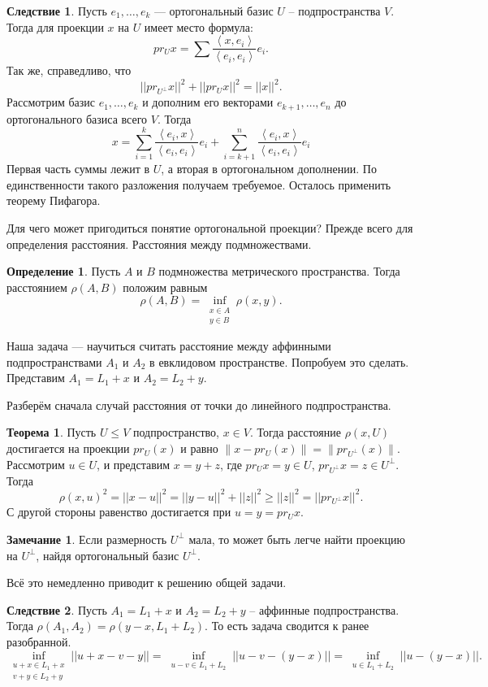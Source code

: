 \documentclass[10pt,a4paper,oneside]{book} %
\theoremstyle{definition}
\newtheorem*{rem}{Замечание}
\newtheorem*{defn}{Определение}
\newtheorem{thm}{Теорема}
\newtheorem{cor}{Следствие}
\def\lan{\left\langle }
\def\ran{\right\rangle}
\def\thrm{\begin{thm}}
\def\ethrm{\end{thm}}
\def\dfn{\begin{defn}}
\def\edfn{\end{defn}}
\def\crl{\begin{cor}}
\def\ecrl{\end{cor}}
\def\rm{\begin{rem}}
\def\erm{\end{rem}}
\begin{document}
\crl Пусть $ e_1,\dots, e_k$ --- ортогональный базис $U$ -- подпространства $V$. Тогда для проекции $x$ на $U$ имеет место формула:
$$ pr_U x= \sum \frac{\lan x,e_i\ran}{\lan e_i,e_i\ran} e_i.$$
Так же, справедливо, что
$$||pr_{U^{\bot}} x||^2 + ||pr_U x||^2=||x||^2.$$
\proof Рассмотрим базис $e_1,\dots, e_k$ и дополним его векторами $e_{k+1},\dots,e_n$ до ортогонального базиса всего $V$. Тогда $$x= \sum_{i=1}^k \frac{\lan e_i,  x\ran}{\lan e_i, e_i\ran}e_i + \sum_{i=k+1}^n \frac{\lan e_i,  x\ran}{\lan e_i, e_i\ran}e_i $$
Первая часть суммы лежит в $U$, а вторая в ортогональном дополнении. По единственности такого разложения получаем требуемое. Осталось применить теорему Пифагора.
\endproof
\ecrl







Для чего может пригодиться понятие ортогональной проекции? Прежде всего для определения расстояния. Расстояния между подмножествами.

\dfn Пусть $A$ и $B$ подмножества метрического пространства. Тогда расстоянием $\rho(A,B)$ положим равным
$$\rho(A,B)=\inf_{\substack{x\in A\\ y \in B}} \rho(x,y).$$
\edfn

Наша задача --- научиться считать расстояние между аффинными подпространствами $A_1$ и $A_2$ в евклидовом пространстве. Попробуем это сделать. Представим $A_1=L_1+x$ и $A_2=L_2+y$. 

Разберём сначала случай расстояния от точки до линейного подпространства. 

\thrm Пусть $U \leq V$ подпространство, $x \in V$. Тогда расстояние $\rho(x,U)$ достигается на проекции  $pr_U(x)$ и равно $\|x-pr_U(x)\|=\|pr_{U^{\bot}}(x)\|$.
\proof Рассмотрим $u \in U$, и представим $x=y+z$, где $pr_Ux=y \in U$, $pr_{U^{\bot}}x =z \in U^{\bot}$. Тогда $$\rho(x,u)^2= ||x-u||^2= ||y - u ||^2+ ||z||^2 \geq ||z||^2=||pr_{U^{\bot}}x||^2 .$$
С другой стороны равенство достигается при $u=y=pr_{U} x$.
\endproof
\ethrm



\rm Если размерность $U^{\bot}$ мала, то может быть легче найти проекцию на $U^{\bot}$, найдя ортогональный базис $U^{\bot}$.
\erm

Всё это немедленно приводит к решению общей задачи.

\crl Пусть  $A_1=L_1+x$ и $A_2=L_2+y$ -- аффинные подпространства. Тогда $\rho(A_1,A_2)=\rho(y-x, L_1+L_2)$. То есть задача сводится к ранее разобранной.
\proof $$\inf_{\substack{u+x\in L_1+x\\ v+y \in L_2+y}} ||u+x-v-y||=\inf_{\substack{u-v\in L_1+ L_2}}||u-v - (y-x)||=\inf_{\substack{u\in L_1+ L_2}}||u- (y-x)||.$$
\endproof
\ecrl
\end{document}
